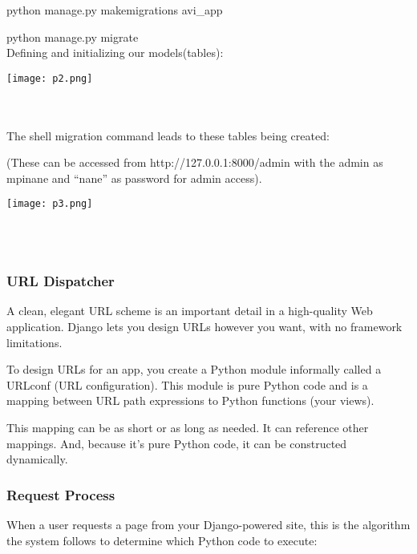 \documentclass[10pt]{article}
\begin{document}
python manage.py makemigrations avi\_app

python manage.py migrate \\

Defining and initializing our models(tables):

\begin{center}
\texttt{[image: p2.png]}
\end{center} \\ \\

 
The shell migration command leads to these tables being created:

(These can be accessed from http://127.0.0.1:8000/admin with the admin as mpinane and “nane” as password for admin access).

\begin{center}
\texttt{[image: p3.png]}
\end{center} \\ \\

\subsubsection{URL  Dispatcher}

A clean, elegant URL scheme is an important detail in a high-quality Web application. Django lets you design URLs however you want, with no framework limitations.

To design URLs for an app, you create a Python module informally called a URLconf (URL configuration). This module is pure Python code and is a mapping between URL path expressions to Python functions (your views).

This mapping can be as short or as long as needed. It can reference other mappings. And, because it’s pure Python code, it can be constructed dynamically.

\subsubsection{Request Process}

When a user requests a page from your Django-powered site, this is the algorithm the system follows to determine which Python code to execute:
\end{document}
